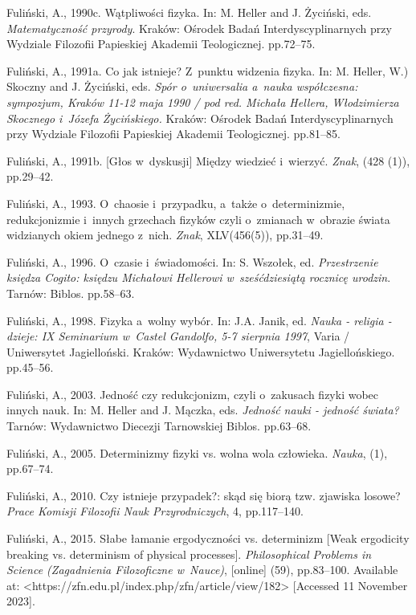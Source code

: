 Fuliński, A., 1990c. Wątpliwości fizyka. In: M. Heller and J. Życiński, eds. \textit{Matematyczność przyrody}. Kraków: Ośrodek Badań Interdyscyplinarnych przy Wydziale Filozofii Papieskiej Akademii Teologicznej. pp.72–75.



Fuliński, A., 1991a. Co jak istnieje? Z~punktu widzenia fizyka. In: M. Heller, W.) Skoczny and J. Życiński, eds. \textit{Spór o~uniwersalia a~nauka współczesna: sympozjum, Kraków 11-12 maja 1990 / pod red. Michała Hellera, Włodzimierza Skocznego i~Józefa Życińskiego.} Kraków: Ośrodek Badań Interdyscyplinarnych przy Wydziale Filozofii Papieskiej Akademii Teologicznej. pp.81–85.



Fuliński, A., 1991b. [Głos w~dyskusji] Między wiedzieć i~wierzyć. \textit{Znak}, (428 (1)), pp.29–42.



Fuliński, A., 1993. O~chaosie i~przypadku, a~także o~determinizmie, redukcjonizmie i~innych grzechach fizyków czyli o~zmianach w~obrazie świata widzianych okiem jednego z~nich. \textit{Znak}, XLV(456(5)), pp.31–49.



Fuliński, A., 1996. O~czasie i~świadomości. In: S. Wszołek, ed. \textit{Przestrzenie księdza Cogito: księdzu Michałowi Hellerowi w~sześćdziesiątą rocznicę urodzin}. Tarnów: Biblos. pp.58–63.



Fuliński, A., 1998. Fizyka a~wolny wybór. In: J.A. Janik, ed. \textit{Nauka - religia - dzieje: IX Seminarium w~Castel Gandolfo, 5-7 sierpnia 1997}, Varia / Uniwersytet Jagielloński. Kraków: Wydawnictwo Uniwersytetu Jagiellońskiego. pp.45–56.



Fuliński, A., 2003. Jedność czy redukcjonizm, czyli o~zakusach fizyki wobec innych nauk. In: M. Heller and J. Mączka, eds. \textit{Jedność nauki - jedność świata?} Tarnów: Wydawnictwo Diecezji Tarnowskiej Biblos. pp.63–68.



Fuliński, A., 2005. Determinizmy fizyki vs. wolna wola człowieka. \textit{Nauka}, (1), pp.67–74.



Fuliński, A., 2010. Czy istnieje przypadek?: skąd się biorą tzw. zjawiska losowe? \textit{Prace Komisji Filozofii Nauk Przyrodniczych}, 4, pp.117–140.



Fuliński, A., 2015. Słabe łamanie ergodyczności vs. determinizm [Weak ergodicity breaking vs. determinism of physical processes]. \textit{Philosophical Problems in Science (Zagadnienia Filozoficzne w~Nauce)}, [online] (59), pp.83–100. Available at: {\textless}https://zfn.edu.pl/index.php/zfn/article/view/182{\textgreater} [Accessed 11 November 2023].



